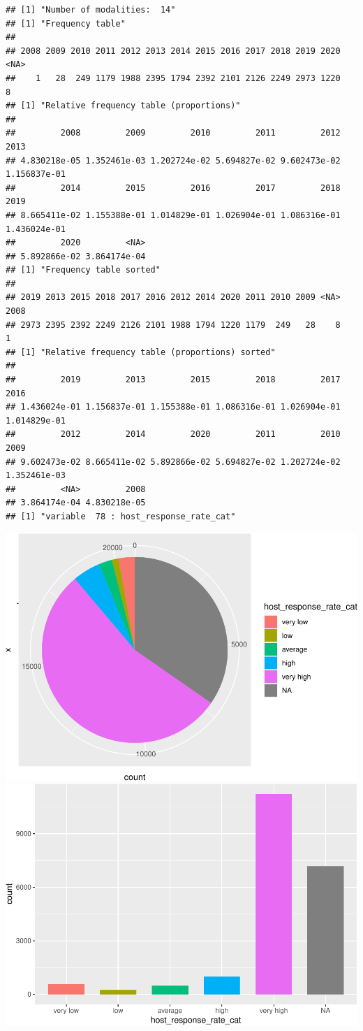 \begin{verbatim}
## [1] "Number of modalities:  14"
## [1] "Frequency table"
## 
## 2008 2009 2010 2011 2012 2013 2014 2015 2016 2017 2018 2019 2020 <NA> 
##    1   28  249 1179 1988 2395 1794 2392 2101 2126 2249 2973 1220    8 
## [1] "Relative frequency table (proportions)"
## 
##         2008         2009         2010         2011         2012         2013 
## 4.830218e-05 1.352461e-03 1.202724e-02 5.694827e-02 9.602473e-02 1.156837e-01 
##         2014         2015         2016         2017         2018         2019 
## 8.665411e-02 1.155388e-01 1.014829e-01 1.026904e-01 1.086316e-01 1.436024e-01 
##         2020         <NA> 
## 5.892866e-02 3.864174e-04 
## [1] "Frequency table sorted"
## 
## 2019 2013 2015 2018 2017 2016 2012 2014 2020 2011 2010 2009 <NA> 2008 
## 2973 2395 2392 2249 2126 2101 1988 1794 1220 1179  249   28    8    1 
## [1] "Relative frequency table (proportions) sorted"
## 
##         2019         2013         2015         2018         2017         2016 
## 1.436024e-01 1.156837e-01 1.155388e-01 1.086316e-01 1.026904e-01 1.014829e-01 
##         2012         2014         2020         2011         2010         2009 
## 9.602473e-02 8.665411e-02 5.892866e-02 5.694827e-02 1.202724e-02 1.352461e-03 
##         <NA>         2008 
## 3.864174e-04 4.830218e-05 
## [1] "variable  78 : host_response_rate_cat"
\end{verbatim}

\includegraphics{anal_files/figure-latex/unnamed-chunk-9-60.pdf}
\includegraphics{anal_files/figure-latex/unnamed-chunk-9-61.pdf}

